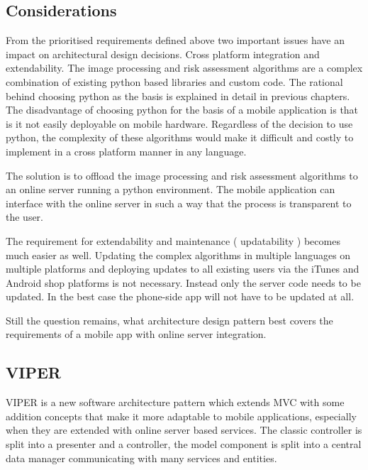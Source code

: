 \subsection{Considerations}

From the prioritised requirements defined above two important issues have an impact on architectural design decisions. Cross platform integration and extendability. The image processing and risk assessment algorithms are a complex combination of existing python based libraries and custom code. The rational behind choosing python as the basis is explained in detail in previous chapters. The disadvantage of choosing python for the basis of a mobile application is that is it not easily deployable on mobile hardware. Regardless of the decision to use python, the complexity of these algorithms would make it difficult and costly to implement in a cross platform manner in any language.

The solution is to offload the image processing and risk assessment algorithms to an online server running a python environment. The mobile application can interface with the online server in such a way that the process is transparent to the user.

The requirement for extendability and maintenance ( updatability ) becomes much easier as well. Updating the complex algorithms in multiple languages on multiple platforms and deploying updates to all existing users via the iTunes and Android shop platforms is not necessary. Instead only the server code needs to be updated. In the best case the phone-side app will not have to be updated at all.

Still the question remains, what architecture design pattern best covers the requirements of a mobile app with online server integration.

\subsection{VIPER}

VIPER is a new software architecture pattern which extends MVC with some addition concepts that make it more adaptable to mobile applications, especially when they are extended with online server based services. The classic controller is split into a presenter and a controller, the model component is split into a central data manager communicating with many services and entities\cite{viper}.

